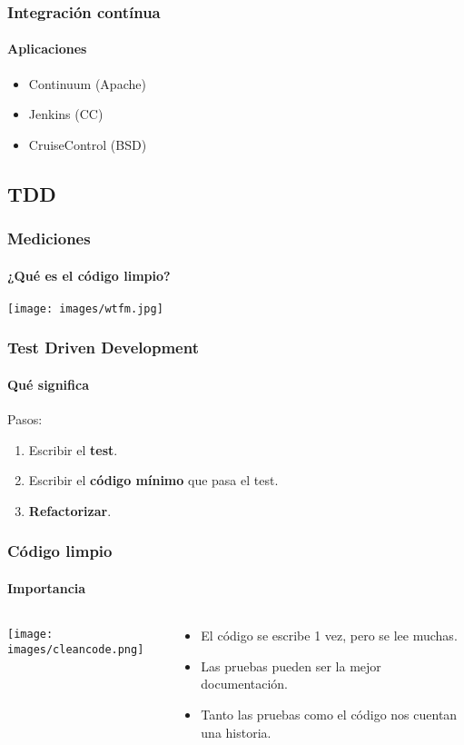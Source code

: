   \begin{frame}
   \frametitle{Integración contínua}
   \framesubtitle{Aplicaciones}

   \begin{itemize}
    \item Continuum (Apache)
    \item Jenkins (CC)
    \item CruiseControl (BSD)
   \end{itemize}
  \end{frame}




  \subsection{TDD}

  \begin{frame}
   \frametitle{Mediciones}
   \framesubtitle{¿Qué es el código limpio?}

   \begin{center}
    \texttt{[image: images/wtfm.jpg]}
   \end{center}
  \end{frame}



  \begin{frame}
   \frametitle{Test Driven Development}
   \framesubtitle{Qué significa}

   Pasos:
   \begin{enumerate}
    \item<+-> Escribir el \textbf{test}.
    \item<+-> Escribir el \textbf{código mínimo} que pasa el test.
    \item<+-> \textbf{Refactorizar}.
   \end{enumerate}
  \end{frame}


  \begin{frame}
   \frametitle{Código limpio}
   \framesubtitle{Importancia}
   \begin{columns}
    \begin{column}{4cm}
     \texttt{[image: images/cleancode.png]}
    \end{column}
    \begin{column}{7cm}
     \begin{itemize}
      \item<+-> El código se escribe 1 vez, pero se lee muchas.
      \item<+-> Las pruebas pueden ser la mejor documentación.
      \item<+-> Tanto las pruebas como el código nos cuentan una historia.
     \end{itemize}
    \end{column}
   \end{columns}
  \end{frame}



